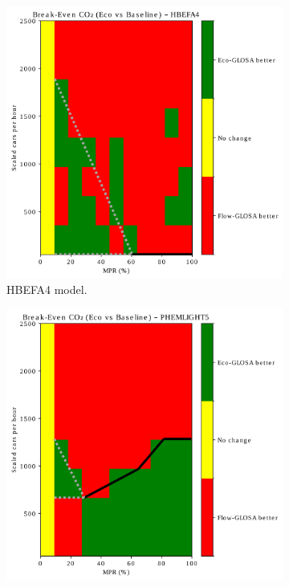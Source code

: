 \begin{figure}[htb]
  \centering
  \begin{subfigure}[b]{0.45\textwidth}
    \includegraphics[width=\textwidth]{data/img/BreakEven/BreakEven_CO2_HBEFA4.pdf}
    \caption{HBEFA4 model.}
    \label{fig:BE_EcoFlow_HBEFA4}
  \end{subfigure}\hfill
  \begin{subfigure}[b]{0.45\textwidth}
    \includegraphics[width=\textwidth]{data/img/BreakEven/BreakEven_CO2_PHEMLIGHT5.pdf}

\end{subfigure}
\end{figure}
